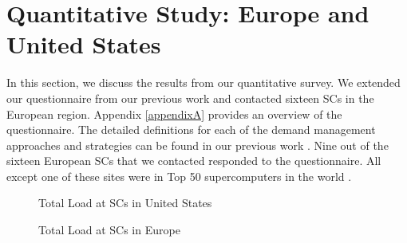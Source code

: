 \section{Quantitative Study: Europe and United States}
\label{res}
In this section, we discuss the results from our quantitative survey. We extended our questionnaire from our previous work \cite{BatesESP} and contacted sixteen SCs in the European region.  Appendix \ref{appendixA} provides an overview of the questionnaire. The detailed definitions for each of the demand management approaches and strategies can be found in our previous work \cite{BatesESP}. Nine out of the sixteen European SCs that we contacted responded to the questionnaire. All except one of these sites were in Top 50 supercomputers in the world \cite{Top500}. 


\begin{figure}[ht!]
\begin{center}
\caption{Total Load at SCs in United States}
\label{fig:USload}
\vspace{0.9cm}
\caption{Total Load at SCs in Europe}
\label{fig:EUload}
\end{center}
\end{figure}

